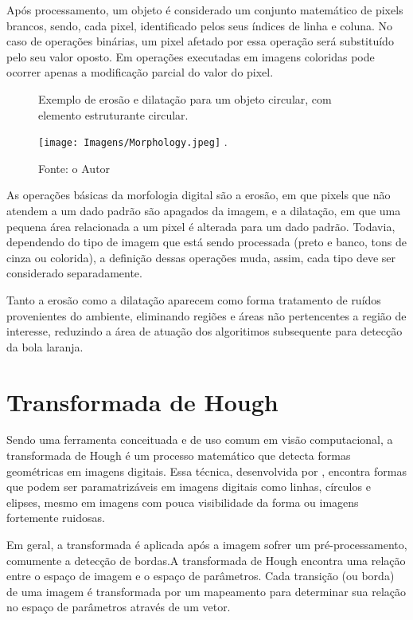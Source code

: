Após processamento, um objeto é considerado um conjunto matemático de pixels brancos, sendo, cada pixel, identificado pelos seus índices de linha e coluna. No caso de operações binárias, um pixel afetado por essa operação será substituído pelo seu valor oposto. Em operações executadas em imagens coloridas pode ocorrer apenas a modificação parcial do valor do pixel.

\begin{figure}[!ht]
\centering \caption{Exemplo de erosão e dilatação para um objeto circular, com elemento estruturante circular.}
\texttt{[image: Imagens/Morphology.jpeg]}
\DeclareGraphicsExtensions.
\caption*{Fonte: o Autor}
\label{Fig:Morfologia}
\end{figure}

As operações básicas da morfologia digital são a erosão, em que pixels que não atendem a um dado padrão são apagados da imagem, e a dilatação, em que uma pequena área relacionada a um pixel é alterada para um dado padrão. Todavia, dependendo do tipo de imagem que está sendo processada (preto e banco, tons de cinza ou colorida), a definição dessas operações muda, assim, cada tipo deve ser considerado separadamente. 

Tanto a erosão como a dilatação aparecem como forma tratamento de ruídos provenientes do ambiente, eliminando regiões e áreas não pertencentes a região de interesse, reduzindo a área de atuação dos algoritimos subsequente para detecção da bola laranja.


\section{Transformada de Hough}

Sendo uma ferramenta conceituada e de uso comum em visão computacional, a transformada de Hough é um processo matemático que detecta formas geométricas em imagens digitais. Essa técnica, desenvolvida por , encontra formas que podem ser paramatrizáveis em imagens digitais como linhas, círculos e elipses, mesmo em imagens com pouca visibilidade da forma ou imagens fortemente ruidosas.

Em geral, a transformada é aplicada após a imagem sofrer um pré-processamento, comumente a detecção de bordas.A transformada de Hough encontra uma relação entre o espaço de imagem e o espaço de parâmetros. Cada transição (ou borda) de uma imagem é transformada por um mapeamento para determinar sua relação no espaço de parâmetros através de um vetor. 

